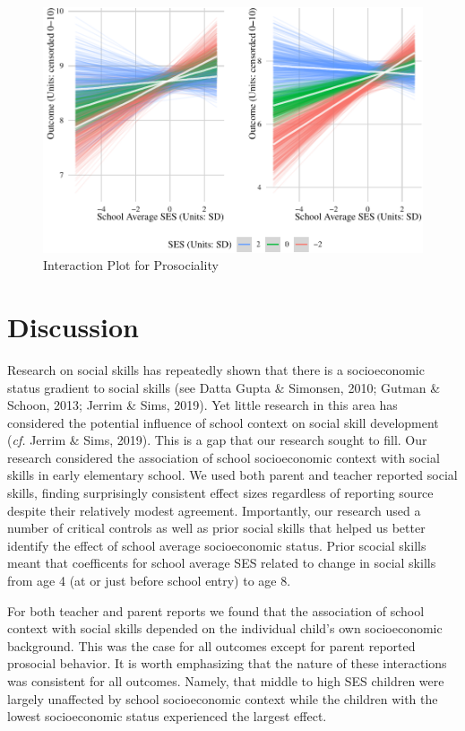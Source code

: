 \documentclass[
  english,
  man]{apa6}
\begin{document}
\begin{figure}
\centering
\includegraphics{manuscript_files/figure-latex/social-1.pdf}
\caption{\label{fig:social}Interaction Plot for Prosociality}
\end{figure}

\hypertarget{discussion}{%
\section{Discussion}\label{discussion}}

Research on social skills has repeatedly shown that there is a socioeconomic status gradient to social skills (see Datta Gupta \& Simonsen, 2010; Gutman \& Schoon, 2013; Jerrim \& Sims, 2019). Yet little research in this area has considered the potential influence of school context on social skill development (\emph{cf.} Jerrim \& Sims, 2019). This is a gap that our research sought to fill. Our research considered the association of school socioeconomic context with social skills in early elementary school. We used both parent and teacher reported social skills, finding surprisingly consistent effect sizes regardless of reporting source despite their relatively modest agreement. Importantly, our research used a number of critical controls as well as prior social skills that helped us better identify the effect of school average socioeconomic status. Prior scocial skills meant that coefficents for school average SES related to change in social skills from age 4 (at or just before school entry) to age 8.

For both teacher and parent reports we found that the association of school context with social skills depended on the individual child's own socioeconomic background. This was the case for all outcomes except for parent reported prosocial behavior. It is worth emphasizing that the nature of these interactions was consistent for all outcomes. Namely, that middle to high SES children were largely unaffected by school socioeconomic context while the children with the lowest socioeconomic status experienced the largest effect.
\end{document}
